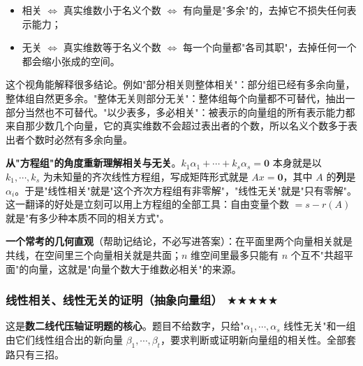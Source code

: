 \documentclass[11pt,openany,UTF8]{ctexbook}
\begin{document}
\begin{itemize}
\item 相关 $\iff$ 真实维数小于名义个数 $\iff$ 有向量是"多余"的，去掉它不损失任何表示能力；
\item 无关 $\iff$ 真实维数等于名义个数 $\iff$ 每一个向量都"各司其职"，去掉任何一个都会缩小张成的空间。
\end{itemize}
这个视角能解释很多结论。例如"部分相关则整体相关"：部分组已经有多余向量，整体组自然更多余。"整体无关则部分无关"：整体组每个向量都不可替代，抽出一部分当然也不可替代。"以少表多，多必相关"：被表示的向量组的所有表示能力都来自那少数几个向量，它的真实维数不会超过表出者的个数，所以名义个数多于表出者个数时必然有多余向量。

\textbf{从"方程组"的角度重新理解相关与无关}。$k_1\alpha_1+\cdots+k_s\alpha_s=\mathbf{0}$ 本身就是以 $k_1,\cdots,k_s$ 为未知量的齐次线性方程组，写成矩阵形式就是 $Ax=\mathbf{0}$，其中 $A$ 的\textbf{列}是 $\alpha_i$。于是"线性相关"就是"这个齐次方程组有非零解"，"线性无关"就是"只有零解"。这一翻译的好处是立刻可以用上方程组的全部工具：自由变量个数 $=s-r(A)$ 就是"有多少种本质不同的相关方式"。

\textbf{一个常考的几何直观}（帮助记结论，不必写进答案）：在平面里两个向量相关就是共线，在空间里三个向量相关就是共面；$n$ 维空间里最多只能有 $n$ 个互不"共超平面"的向量，这就是"向量个数大于维数必相关"的来源。

\subsubsection{线性相关、线性无关的证明（抽象向量组） $\bigstar$$\bigstar$$\bigstar$$\bigstar$$\bigstar$}

这是\textbf{数二线代压轴证明题的核心}。题目不给数字，只给"$\alpha_1,\cdots,\alpha_s$ 线性无关"和一组由它们线性组合出的新向量 $\beta_1,\cdots,\beta_t$，要求判断或证明新向量组的相关性。全部套路只有三招。
\end{document}
